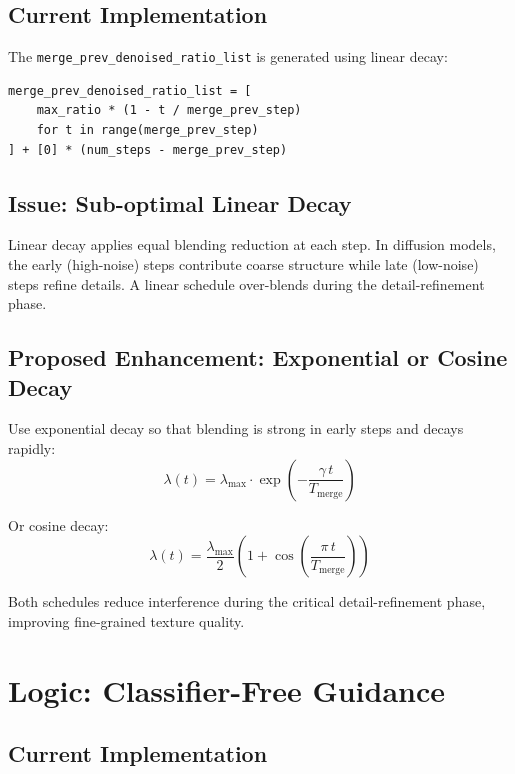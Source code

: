 \documentclass[11pt,a4paper]{article}
\newcommand{\fn}[1]{\texttt{#1}}
\begin{document}
\subsection{Current Implementation}

The \fn{merge\_prev\_denoised\_ratio\_list} is generated using linear decay:
\begin{lstlisting}
merge_prev_denoised_ratio_list = [
    max_ratio * (1 - t / merge_prev_step)
    for t in range(merge_prev_step)
] + [0] * (num_steps - merge_prev_step)
\end{lstlisting}

\subsection{Issue: Sub-optimal Linear Decay}

Linear decay applies equal blending reduction at each step.
In diffusion models, the early (high-noise) steps contribute coarse structure while late (low-noise) steps refine details.
A linear schedule over-blends during the detail-refinement phase.

\subsection{Proposed Enhancement: Exponential or Cosine Decay}

Use exponential decay so that blending is strong in early steps and decays rapidly:
\begin{equation}
    \lambda(t) = \lambda_{\max} \cdot \exp\left(-\frac{\gamma \, t}{T_{\text{merge}}}\right)
\end{equation}

Or cosine decay:
\begin{equation}
    \lambda(t) = \frac{\lambda_{\max}}{2} \left(1 + \cos\left(\frac{\pi \, t}{T_{\text{merge}}}\right)\right)
\end{equation}

Both schedules reduce interference during the critical detail-refinement phase, improving fine-grained texture quality.

\section{Logic: Classifier-Free Guidance}

\subsection{Current Implementation}
\end{document}
